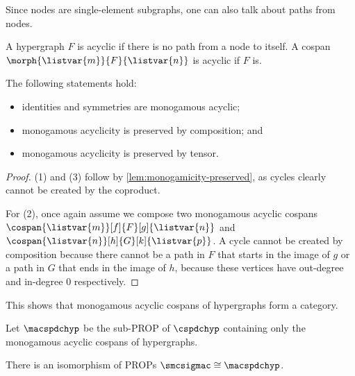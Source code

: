 Since nodes are single-element subgraphs, one can also talk about paths from
nodes.

\begin{definition}
    A hypergraph \(F\) is acyclic if there is no path from a node to itself.
    A cospan \(\morph{\listvar{m}}{F}{\listvar{n}}\) is acyclic if \(F\) is.
\end{definition}

\begin{lemma}
    \label{lem:monogamous-acyclic-preserved}
    The following statements hold:
    \begin{itemize}
        \item identities and symmetries are monogamous acyclic;
        \item monogamous acyclicity is preserved by composition; and
        \item monogamous acyclicity is preserved by tensor.
    \end{itemize}
\end{lemma}
\begin{proof}
    (1) and (3) follow by \cref{lem:monogamicity-preserved}, as cycles clearly
    cannot be created by the coproduct.

    For (2), once again assume we compose two monogamous acyclic cospans \(
        \cospan{\listvar{m}}[f]{F}[g]{\listvar{n}}
    \) and \(
        \cospan{\listvar{n}}[h]{G}[k]{\listvar{p}}
    \).
    A cycle cannot be created by composition because there cannot be a path in
    \(F\) that starts in the image of \(g\) or a path in \(G\) that ends in the
    image of \(h\), because these vertices have out-degree and in-degree \(0\)
    respectively.
\end{proof}

This shows that monogamous acyclic cospans of hypergraphs form a category.

\begin{definition}
    Let \(\macspdchyp\) be the sub-PROP of \(\cspdchyp\) containing only the
    monogamous acyclic cospans of hypergraphs.
\end{definition}


\begin{definition}
\end{definition}

\begin{lemma}
\end{lemma}

\begin{corollary}
\end{corollary}

\begin{corollary}
    There is an isomorphism of PROPs \(\smcsigmac \cong \macspdchyp\).
\end{corollary}